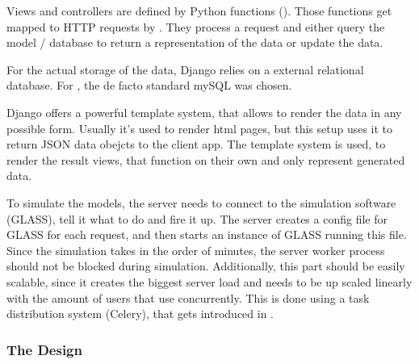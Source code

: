 Views and controllers are defined by Python functions ().
Those functions get mapped to HTTP requests by .
They process a request and either query the model / database to return a representation of the data or update the data.

For the actual storage of the data, Django relies on a external relational database.
For \spl, the de facto standard mySQL was chosen.

Django offers a powerful template system, that allows to render the data in any possible form.
Usually it's used to render html pages, but this setup uses it to return JSON data obejcts to the client app.
The template system is used, to render the result views, that function on their own and only represent generated data.

To simulate the models, the server needs to connect to the simulation software (GLASS), tell it what to do and fire it up.
The server creates a config file for GLASS for each request, and then starts an instance of GLASS running this file.
Since the simulation takes in the order of minutes, the server worker process should not be blocked during simulation.
Additionally, this part should be easily scalable, since it creates the biggest server load and needs to be up scaled linearly with the amount of users that use \spl concurrently.
This is done using a task distribution system (Celery), that gets introduced in .







\subsubsection{The Design}







